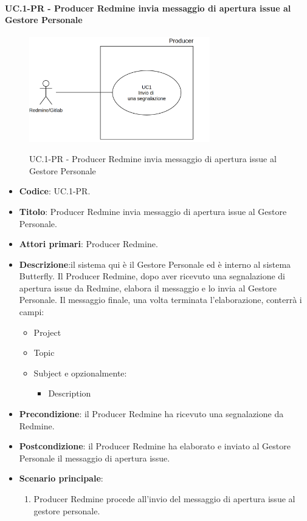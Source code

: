 		\paragraph{UC\theuccount.1-PR - Producer Redmine invia messaggio di apertura issue al Gestore Personale}
	\begin{figure}[H]
		\centering
		\includegraphics[width=0.7\textwidth]{img/UC1.png}\\
		\caption{UC\theuccount.1-PR - Producer Redmine invia messaggio di apertura issue al Gestore Personale}
	\end{figure}
	\begin{itemize}
		\item \textbf{Codice}: UC\theuccount.1-PR.
		\item \textbf{Titolo}: Producer Redmine invia messaggio di apertura issue al Gestore Personale.
		\item \textbf{Attori primari}: Producer Redmine.
		\item \textbf{Descrizione}:il sistema qui è il Gestore Personale
		ed è interno al sistema Butterfly. Il Producer Redmine, dopo aver
		ricevuto una segnalazione di apertura issue da Redmine, elabora
		il messaggio e lo invia al Gestore Personale.
		Il messaggio finale, una volta terminata l'elaborazione, conterrà i campi:
		\begin{itemize}
			\item Project
			\item Topic
			\item Subject e opzionalmente:
			\begin{itemize}
				\item Description
			\end{itemize}
		\end{itemize}
		\item \textbf{Precondizione}: il Producer Redmine ha ricevuto una segnalazione da Redmine.
		\item \textbf{Postcondizione}: il Producer Redmine ha elaborato e inviato al Gestore Personale il messaggio di apertura issue.
		\item \textbf{Scenario principale}: 
		\begin{enumerate}
			\item Producer Redmine procede all'invio del messaggio di
			apertura issue al gestore personale.
		\end{enumerate}
		
	\end{itemize}
	
